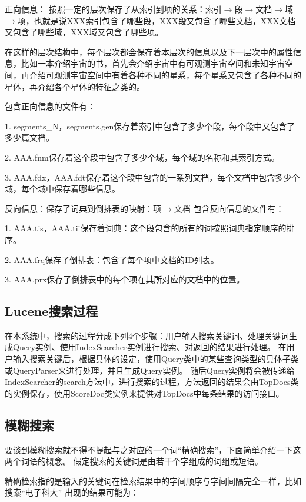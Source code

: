 正向信息：
按照一定的层次保存了从索引到项的关系：索引$\rightarrow$段$\rightarrow$文档$\rightarrow$域\\$\rightarrow$项，也就是说XXX索引包含了哪些段，XXX段又包含了哪些文档，XXX文档又包含了哪些域，XXX域又包含了哪些项。

在这样的层次结构中，每个层次都会保存着本层次的信息以及下一层次中的属性信息，比如一本介绍宇宙的书，首先会介绍宇宙中有可观测宇宙空间和未知宇宙空间，再介绍可观测宇宙空间中有着各种不同的星系，每个星系又包含了各种不同的星体，再介绍各个星体的特征之类的。

包含正向信息的文件有：

1. segments\_N，segments.gen保存着索引中包含了多少个段，每个段中又包含了多少篇文档。

2. AAA.fnm保存着这个段中包含了多少个域，每个域的名称和其索引方式。

3. AAA.fdx，AAA.fdt保存着这个段中包含的一系列文档，每个文档中包含多少个域，每个域中保存着哪些信息。

反向信息：保存了词典到倒排表的映射：项$\rightarrow$文档
包含反向信息的文件有：

1. AAA.tis，AAA.tii保存着词典：这个段包含的所有的词按照词典指定顺序的排序。

2. AAA.frq保存了倒排表：包含了每个项中文档的ID列表。

3. AAA.prx保存了倒排表中的每个项在其所对应的文档中的位置。

\subsection{Lucene搜索过程}
在本系统中，搜索的过程分成下列4个步骤：用户输入搜索关键词、处理关键词生成Query实例、使用IndexSearcher实例进行搜索、对返回的结果进行处理。
在用户输入搜索关键后，根据具体的设定，使用Query类中的某些查询类型的具体子类或QueryParser来进行处理，并且生成Query实例。
随后Query实例将会被传递给IndexSearcher的search方法中，进行搜索的过程，方法返回的结果会由TopDocs类的实例保存，使用ScoreDoc类实例来提供对TopDocs中每条结果的访问接口。


\subsection{模糊搜索}
要谈到模糊搜索就不得不提起与之对应的一个词“精确搜索”，下面简单介绍一下这两个词语的概念。
假定搜索的关键词是由若干个字组成的词组或短语。

精确检索指的是输入的关键词在检索结果中的字间顺序与字间间隔完全一样，比如搜索“电子科大”
出现的结果可能为：

